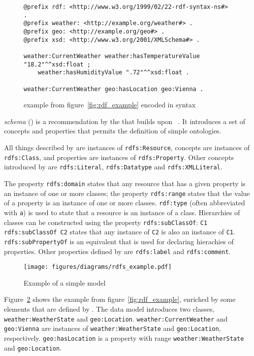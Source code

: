 \begin{figure}
\begin{lstlisting}
@prefix rdf: <http://www.w3.org/1999/02/22-rdf-syntax-ns#> .
@prefix weather: <http://example.org/weather#> .
@prefix geo: <http://example.org/geo#> .
@prefix xsd: <http://www.w3.org/2001/XMLSchema#> .

weather:CurrentWeather weather:hasTemperatureValue "18.2"^^xsd:float ;
    weather:hasHumidityValue ".72"^^xsd:float .

weather:CurrentWeather geo:hasLocation geo:Vienna .
\end{lstlisting}
\caption{ example from figure~\ref{fig:rdf_example} encoded in  syntax}
\label{fig:turtle_example}
\end{figure}

 \emph{schema} () is a recommendation by the  that builds upon ~\cite{RDFS}. It introduces a set of concepts and properties that permits the definition of simple ontologies. 

All things described by  are instances of \texttt{rdfs:Resource}, concepts are instances of \texttt{rdfs:Class}, and properties are instances of \texttt{rdfs:Property}. Other concepts introduced by  are \texttt{rdfs:Literal}, \texttt{rdfs:Datatype} and \texttt{rdfs:XMLLiteral}.

The property \texttt{rdfs:domain} states that any resource that has a given property is an instance of one or more classes; the property \texttt{rdfs:range} states that the value of a property is an instance of one or more classes. \texttt{rdf:type} (often abbreviated with \texttt{a}) is used to state that a resource is an instance of a class. Hierarchies of classes can be constructed using the property \texttt{rdfs:subClassOf}: \texttt{C1 rdfs:subClassOf C2} states that any instance of \texttt{C2} is also an instance of \texttt{C1}. \texttt{rdfs:subPropertyOf} is an equivalent that is used for declaring hierachies of properties. Other properties defined by  are \texttt{rdfs:label} and \texttt{rdfs:comment}.

\begin{figure}
\centering
\texttt{[image: figures/diagrams/rdfs\_example.pdf]}
\caption{Example of a simple  model}
\label{fig:rdfs_example}
\end{figure}

Figure~\ref{fig:rdfs_example} shows the example from figure~\ref{fig:rdf_example}, enriched by some elements that are defined by . The data model introduces two classes, \texttt{weather:WeatherState} and \texttt{geo:Location}. \texttt{weather:CurrentWeather} and \texttt{geo:Vienna} are instances of \texttt{weather:WeatherState} and \texttt{geo:Location}, respectively. \texttt{geo:hasLocation} is a property with range \texttt{weather:WeatherState} and \texttt{geo:Location}.

